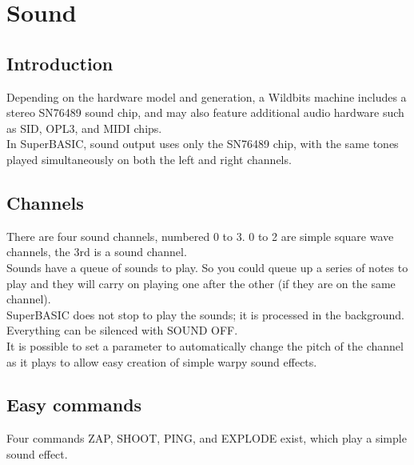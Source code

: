 \chapter{Sound}

\section{Introduction}

Depending on the hardware model and generation, a Wildbits machine includes a stereo SN76489 sound chip, and may also feature additional audio hardware such as SID, OPL3, and MIDI chips.\\

In SuperBASIC, sound output uses only the SN76489 chip, with the same tones played simultaneously on both the left and right channels.

\section{Channels}

There are four sound channels, numbered 0 to 3. 0 to 2 are simple square wave channels, the 3rd is a sound channel.\\

Sounds have a queue of sounds to play. So you could queue up a series of notes to play and they will carry on playing one after the other (if they are on the same channel).\\

SuperBASIC does not stop to play the sounds; it is processed in the background. Everything can be silenced with SOUND OFF.\\

It is possible to set a parameter to automatically change the pitch of the channel as it plays to allow easy creation of simple warpy sound effects.

\section{Easy commands}

Four commands ZAP, SHOOT, PING, and EXPLODE exist, which play a simple sound effect.




